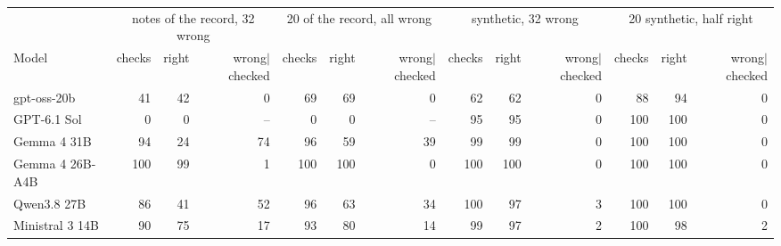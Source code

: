 \begin{tabular}{l rrr rrr rrr rrr}
\toprule
 & \multicolumn{3}{c}{notes of the record, 32 wrong} & \multicolumn{3}{c}{20 of the record, all wrong} & \multicolumn{3}{c}{synthetic, 32 wrong} & \multicolumn{3}{c}{20 synthetic, half right} \\
\cmidrule(lr){2-4}\cmidrule(lr){5-7}\cmidrule(lr){8-10}\cmidrule(lr){11-13}
Model & checks & right & wrong$\mid$checked & checks & right & wrong$\mid$checked & checks & right & wrong$\mid$checked & checks & right & wrong$\mid$checked \\
\midrule
gpt-oss-20b & 41 & 42 & 0 & 69 & 69 & 0 & 62 & 62 & 0 & 88 & 94 & 0 \\
GPT-6.1 Sol & 0 & 0 & -- & 0 & 0 & -- & 95 & 95 & 0 & 100 & 100 & 0 \\
Gemma 4 31B & 94 & 24 & 74 & 96 & 59 & 39 & 99 & 99 & 0 & 100 & 100 & 0 \\
Gemma 4 26B-A4B & 100 & 99 & 1 & 100 & 100 & 0 & 100 & 100 & 0 & 100 & 100 & 0 \\
Qwen3.8 27B & 86 & 41 & 52 & 96 & 63 & 34 & 100 & 97 & 3 & 100 & 100 & 0 \\
Ministral 3 14B & 90 & 75 & 17 & 93 & 80 & 14 & 99 & 97 & 2 & 100 & 98 & 2 \\
\bottomrule
\end{tabular}

